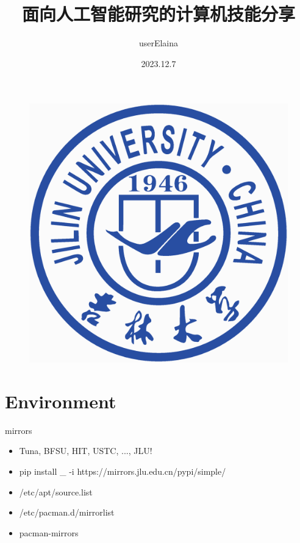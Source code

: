 \documentclass{beamer}
\author{userElaina}
\title{面向人工智能研究的计算机技能分享}
\institute{人工智能学院}
\date{2023.12.7}
\begin{document}
\kaishu
\begin{frame}
    \titlepage
    \begin{figure}[htpb]
        \begin{center}
            \includegraphics[width=0.15\linewidth]{pic/Jilin_University_Logo.eps}
        \end{center}
    \end{figure}
\end{frame}

\begin{frame}
\tableofcontents[sectionstyle=show,subsectionstyle=show/shaded/hide,subsubsectionstyle=show/shaded/hide]
\end{frame}





\section{Environment}

\begin{frame}{mirrors}
    \begin{itemize}
        \item Tuna, BFSU, HIT, USTC, ..., JLU!
        \item pip install \_ -i https://mirrors.jlu.edu.cn/pypi/simple/
        \item /etc/apt/source.list
        \item /etc/pacman.d/mirrorlist
        \item pacman-mirrors
    \end{itemize}
\end{frame}
\end{document}
